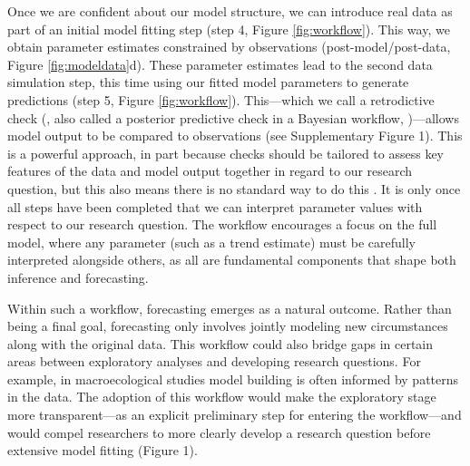 \documentclass[11pt]{article}
\newcommand{\llabel}[1]{\hypertarget{lintarget:#1}{}\linelabel{lin:#1}}
\begin{document}
Once we are confident about our model structure, we can introduce real data as part of an initial model fitting step (step 4, Figure \ref{fig:workflow}). This way, we obtain parameter estimates constrained by observations (\llabel{quad7}post-model/post-data, Figure \ref{fig:modeldata}d). 
These parameter estimates lead to the second data simulation step, this time using our fitted model parameters to generate predictions (step 5, Figure \ref{fig:workflow}). This---which we call a retrodictive check (\citealp{betanworkflow}, also called a \llabel{PPC}posterior predictive check in a Bayesian workflow,  \citealp{Gelman2020})---allows model output to be compared to observations \llabel{suppfig1}(see Supplementary Figure 1). \llabel{howtoPPC} This is a powerful approach, in part because checks should be tailored to assess key features of the data and model output together in regard to our research question, but this also means there is no standard way to do this \citep{Gelman2020}.
It is only once all steps have been completed that we can interpret parameter values with respect to our research question.
The workflow encourages a focus on the full model, where any parameter (such as a trend estimate) must be carefully interpreted alongside others, as all are fundamental components that shape both inference and forecasting. 

Within such a workflow, forecasting emerges as a natural outcome. Rather than being a final goal, forecasting only involves jointly modeling new circumstances along with the original data. This workflow could also bridge gaps in certain areas between exploratory analyses and developing research questions. For example, in macroecological studies model building is often informed by patterns in the data. The adoption of this workflow would make the exploratory stage more transparent---as an explicit preliminary step for entering the workflow---and would compel researchers to more clearly develop a research question before extensive model fitting (Figure 1). 
\end{document}
